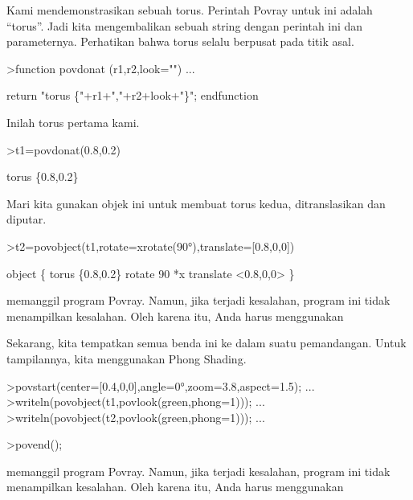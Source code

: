 \documentclass[a4paper,10pt]{article}
\begin{document}
\begin{eulernotebook}
\begin{eulercomment}
\begin{eulercomment}
\begin{eulercomment}
\begin{eulercomment}
\begin{eulercomment}
\begin{eulercomment}
\begin{eulercomment}
\begin{eulercomment}
\begin{eulercomment}
\begin{eulercomment}
\begin{eulercomment}
Kami mendemonstrasikan sebuah torus. Perintah Povray untuk ini adalah
“torus”. Jadi kita mengembalikan sebuah string dengan perintah ini dan
parameternya. Perhatikan bahwa torus selalu berpusat pada titik asal.
\end{eulercomment}
\begin{eulerprompt}
>function povdonat (r1,r2,look="") ...
\end{eulerprompt}
\begin{eulerudf}
    return "torus \{"+r1+","+r2+look+"\}";
  endfunction
\end{eulerudf}
\begin{eulercomment}
Inilah torus pertama kami.
\end{eulercomment}
\begin{eulerprompt}
>t1=povdonat(0.8,0.2)
\end{eulerprompt}
\begin{euleroutput}
  torus \{0.8,0.2\}
\end{euleroutput}
\begin{eulercomment}
Mari kita gunakan objek ini untuk membuat torus kedua, ditranslasikan
dan diputar.
\end{eulercomment}
\begin{eulerprompt}
>t2=povobject(t1,rotate=xrotate(90°),translate=[0.8,0,0])
\end{eulerprompt}
\begin{euleroutput}
  object \{ torus \{0.8,0.2\}
   rotate 90 *x 
   translate <0.8,0,0>
   \}
\end{euleroutput}
\begin{eulercomment}
memanggil program Povray. Namun, jika terjadi kesalahan, program ini
tidak menampilkan kesalahan. Oleh karena itu, Anda harus menggunakan

Sekarang, kita tempatkan semua benda ini ke dalam suatu pemandangan.
Untuk tampilannya, kita menggunakan Phong Shading.
\end{eulercomment}
\begin{eulerprompt}
>povstart(center=[0.4,0,0],angle=0°,zoom=3.8,aspect=1.5); ...
>writeln(povobject(t1,povlook(green,phong=1))); ...
>writeln(povobject(t2,povlook(green,phong=1))); ...
\end{eulerprompt}
\begin{eulerttcomment}
 >povend();
\end{eulerttcomment}
\begin{eulercomment}
memanggil program Povray. Namun, jika terjadi kesalahan, program ini
tidak menampilkan kesalahan. Oleh karena itu, Anda harus menggunakan


\end{eulercomment}
\end{eulercomment}
\end{eulercomment}
\end{eulercomment}
\end{eulercomment}
\end{eulercomment}
\end{eulercomment}
\end{eulercomment}
\end{eulercomment}
\end{eulercomment}
\end{eulercomment}
\end{eulernotebook}
\end{document}
